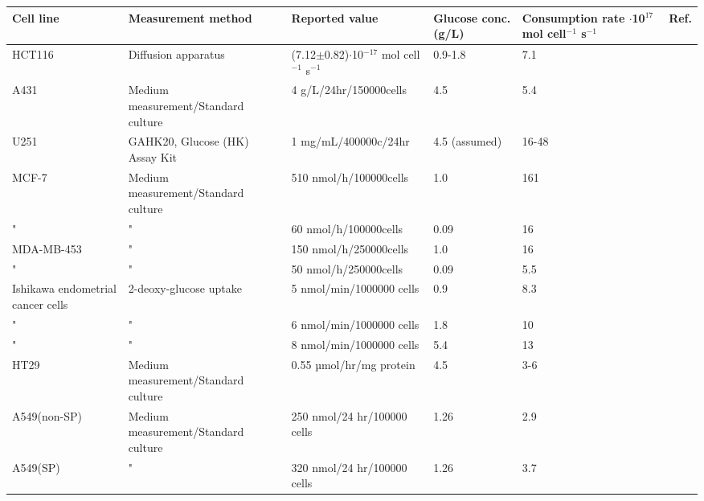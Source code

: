 \documentclass[11pt,a4paper]{article}
\begin{document}
\begin{table}[h!]
\begin{center}
\begin{tabular}{ |p{18mm}|p{26mm}|p{35mm}|p{20mm}|p{25mm}|p{7mm}| }
 \hline

 \textbf{Cell line}  & \textbf{Measurement method} & \textbf{Reported  value} & Glucose conc. (g/L) &  \textbf{Consumption rate} $\cdot$10$^{17}$ mol cell$^{-1}$ s$^{-1}$  & Ref. \\
 \hline
 HCT116 & Diffusion apparatus & (7.12$\pm$0.82)$\cdot$10$^{-17}$ mol cell$^{-1}$ s$^{-1}$& 0.9-1.8 & 7.1 & \cite{Mao2018}\\
 \hline
   A431 & Medium measurement/Standard culture  & 4 g/L/24hr/150000cells & 4.5  & 5.4 & \cite{Ang2020}\\
 \hline
    U251 &  GAHK20, Glucose (HK) Assay Kit & 1 mg/mL/400000c/24hr & 4.5 (assumed) & 16-48 & \cite{Liu2021}\\
 \hline
    MCF-7 & Medium measurement/Standard culture  & 510 nmol/h/100000cells & 1.0 & 161 & \cite{Mazurek1997}\\
 \hline
     " & "  & 60 nmol/h/100000cells & 0.09 & 16 & \cite{Mazurek1997}\\
 \hline
     MDA-MB-453 & "  & 150 nmol/h/250000cells & 1.0 & 16 & \cite{Mazurek1997}\\
 \hline
     " & "  & 50 nmol/h/250000cells & 0.09 & 5.5 & \cite{Mazurek1997}\\
 \hline
 	Ishikawa endometrial cancer cells & 2-deoxy-glucose uptake & 5 nmol/min/1000000 cells & 0.9 & 8.3 & \cite{Medina2004}\\
\hline
 	" & " & 6 nmol/min/1000000 cells & 1.8 & 10 & \cite{Medina2004}\\
\hline
 	" & " & 8 nmol/min/1000000 cells & 5.4 & 13 & \cite{Medina2004}\\
\hline
 HT29 & Medium measurement/Standard culture & 0.55 µmol/hr/mg protein  & 4.5 & 3-6 & \cite{Gauthier1989}\\
 \hline
  A549(non-SP) & Medium measurement/Standard culture & 250 nmol/24 hr/100000 cells  & 1.26 & 2.9 & \cite{Liu2013}\\
 \hline
   A549(SP) & " & 320 nmol/24 hr/100000 cells  & 1.26 & 3.7 & \cite{Liu2013}\\
 \hline

\end{tabular}
\end{center}
\end{table}
\end{document}
